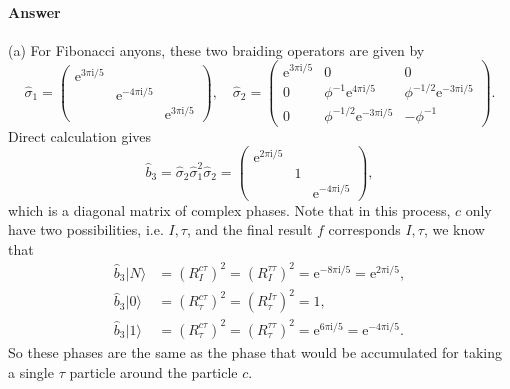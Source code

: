 \paragraph{Answer}
(a) For Fibonacci anyons, these two braiding operators are given by
\begin{equation*}
\hat{\sigma }_{1} =\begin{pmatrix}
\mathrm{e}^{3\pi \mathrm{i} /5} &  & \\
 & \mathrm{e}^{-4\pi \mathrm{i} /5} & \\
 &  & \mathrm{e}^{3\pi \mathrm{i} /5}
\end{pmatrix} ,\quad \hat{\sigma }_{2} =\begin{pmatrix}
\mathrm{e}^{3\pi \mathrm{i} /5} & 0 & 0\\
0 & \phi ^{-1}\mathrm{e}^{4\pi \mathrm{i} /5} & \phi ^{-1/2}\mathrm{e}^{-3\pi \mathrm{i} /5}\\
0 & \phi ^{-1/2}\mathrm{e}^{-3\pi \mathrm{i} /5} & -\phi ^{-1}
\end{pmatrix} .
\end{equation*}
Direct calculation gives
\begin{equation*}
\hat{b}_{3} =\hat{\sigma }_{2}\hat{\sigma }_{1}^{2}\hat{\sigma }_{2} =\begin{pmatrix}
\mathrm{e}^{2\pi \mathrm{i} /5} &  & \\
 & 1 & \\
 &  & \mathrm{e}^{-4\pi \mathrm{i} /5}
\end{pmatrix} ,
\end{equation*}
which is a diagonal matrix of complex phases. Note that in this process, $c$ only have two possibilities, i.e. $I,\tau $, and the final result $f$ corresponds $I,\tau $, we know that
\begin{equation*}
\begin{aligned}
\hat{b}_{3} |N\rangle  & =(R_{I}^{c\tau } )^{2} =(R_{I}^{\tau \tau } )^{2} =\mathrm{e}^{-8\pi \mathrm{i} /5} =\mathrm{e}^{2\pi \mathrm{i} /5} ,\\
\hat{b}_{3} |0\rangle  & =(R_{\tau }^{c\tau } )^{2} =(R_{\tau }^{I\tau } )^{2} =1,\\
\hat{b}_{3} |1\rangle  & =(R_{\tau }^{c\tau } )^{2} =(R_{\tau }^{\tau \tau } )^{2} =\mathrm{e}^{6\pi \mathrm{i} /5} =\mathrm{e}^{-4\pi \mathrm{i} /5} .
\end{aligned}
\end{equation*}
So these phases are the same as the phase that would be accumulated for taking a single $\tau $ particle around the particle $c$.



